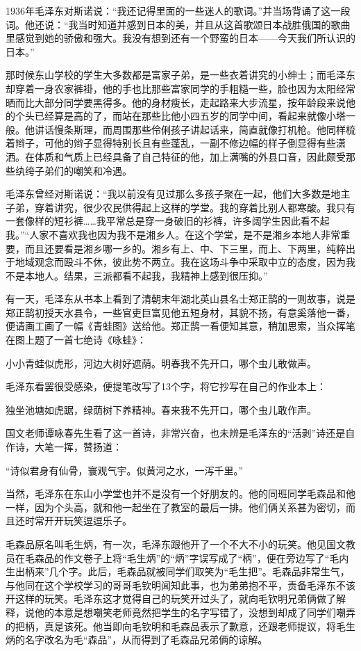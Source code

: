 \documentclass[../../dazhuan.tex]{subfiles}
\begin{document}
1936年毛泽东对斯诺说：“我还记得里面的一些迷人的歌词。”并当场背诵了这一段词。他还说：“我当时知道并感到日本的美，并且从这首歌颂日本战胜俄国的歌曲里感觉到她的骄傲和强大。我没有想到还有一个野蛮的日本——今天我们所认识的日本。”

那时候东山学校的学生大多数都是富家子弟，是一些衣着讲究的小绅士；而毛泽东却穿着一身农家裤褂，他的手也比那些富家同学的手粗糙一些，脸也因为太阳经常晒而比大部分同学要黑得多。他的身材瘦长，走起路来大步流星，按年龄段来说他的个头已经算是高的了，而站在那些比他小四五岁的同学中间，看起来就像小塔一般。他讲话慢条斯理，而周围那些伶俐孩子讲起话来，简直就像打机枪。他同样梳着辫子，可他的辫子显得特别长且有些蓬乱，一副不修边幅的样子倒显得有些潇洒。在体质和气质上已经具备了自己特征的他，加上满嘴的外县口音，因此颇受那些纨绔子弟们的嘲笑和冷遇。

毛泽东曾经对斯诺说：“我以前没有见过那么多孩子聚在一起，他们大多数是地主子弟，穿着讲究，很少农民供得起上这样的学堂。我的穿着比别人都寒酸。我只有一套像样的短衫裤……我平常总是穿一身破旧的衫裤，许多阔学生因此看不起我。”“人家不喜欢我也因为我不是湘乡人。在这个学堂，是不是湘乡本地人非常重要，而且还要看是湘乡哪一乡的。湘乡有上、中、下三里，而上、下两里，纯粹出于地域观念而殴斗不休，彼此势不两立。我在这场斗争中采取中立的态度，因为我不是本地人。结果，三派都看不起我，我精神上感到很压抑。”

有一天，毛泽东从书本上看到了清朝末年湖北英山县名士郑正鹄的一则故事，说是郑正鹄初授天水县令，一些官吏巨富见他五短身材，其貌不扬，有意奚落他一番，便请画工画了一幅《青蛙图》送给他。郑正鹄一看便知其意，稍加思索，当众挥笔在图上题了一首七绝诗《咏蛙》：

小小青蛙似虎形，河边大树好遮荫。明春我不先开口，哪个虫儿敢做声。

毛泽东看罢很受感染，便提笔改写了13个字，将它抄写在自己的作业本上：

独坐池塘如虎踞，绿荫树下养精神。春来我不先开口，哪个虫儿敢作声。

国文老师谭咏春先生看了这一首诗，非常兴奋，也未辨是毛泽东的“活剥”诗还是自作诗，大笔一挥，赞扬道：

“诗似君身有仙骨，寰观气宇。似黄河之水，一泻千里。”

当然，毛泽东在东山小学堂也并不是没有一个好朋友的。他的同班同学毛森品和他一样，因为个头高，就和他一起坐在了教室的最后一排。他们俩关系甚为密切，而且还时常开开玩笑逗逗乐子。

毛森品原名叫毛生炳，有一次，毛泽东跟他开了一个不大不小的玩笑。他见国文教员在毛森品的作文卷子上将“毛生炳”的“炳”字误写成了“柄”，便在旁边写了“毛内生出柄来”几个字。此后，毛森品就被同学们取笑为“毛生把”。毛森品非常生气，与他同在这个学校学习的哥哥毛钦明闻知此事，也为弟弟抱不平，责备毛泽东不该开这样的玩笑。毛泽东这才觉得自己的玩笑开过头了，就向毛钦明兄弟俩做了解释，说他的本意是想嘲笑老师竟然把学生的名字写错了，没想到却成了同学们嘲弄的把柄，真是该死。他当即向毛钦明和毛森品表示了歉意，还跟老师提议，将毛生炳的名字改名为毛“森品”，从而得到了毛森品兄弟俩的谅解。
\end{document}
